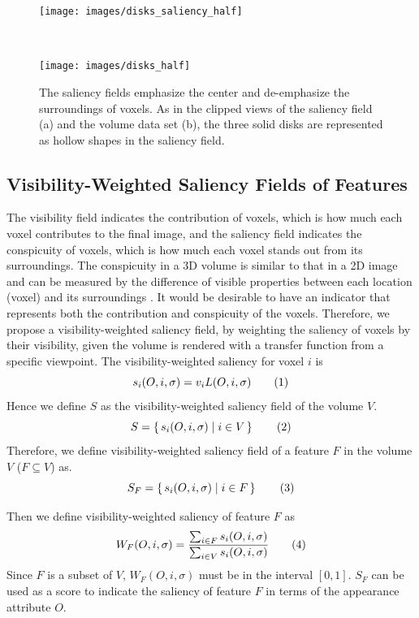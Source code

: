 \begin{figure}
	\centering
	\begin{minipage}{.4\textwidth}
		\texttt{[image: images/disks\_saliency\_half]}
		\subcaption{}
	\end{minipage}~
	\begin{minipage}{.4\textwidth}
		\texttt{[image: images/disks\_half]}
		\subcaption{}
	\end{minipage}
	\caption[The saliency fields emphasize the center and de-emphasize the surroundings of voxels.]{The saliency fields emphasize the center and de-emphasize the surroundings of voxels. As in the clipped views of the saliency field (a) and the volume data set (b), the three solid disks are represented as hollow shapes in the saliency field.}
	\label{fig:disks_saliency_half}
\end{figure}

\subsection{Visibility-Weighted Saliency Fields of Features \label{visibility_weighted_saliency}}
The visibility field indicates the contribution of voxels, which is how much each voxel contributes to the final image, and the saliency field indicates the conspicuity of voxels, which is how much each voxel stands out from its surroundings.
The conspicuity in a 3D volume is similar to that in a 2D image and can be measured by the difference of visible properties between each location (voxel) and its surroundings \cite{duan_visual_2011}.
It would be desirable to have an indicator that represents both the contribution and conspicuity of the voxels.
Therefore, we propose a visibility-weighted saliency field, by weighting the saliency of voxels by their visibility, given the volume is rendered with a transfer function from a specific viewpoint.
The visibility-weighted saliency for voxel $ i $ is
\[ s_{i}(O,i,\sigma)= v_{i} L(O,i,\sigma)
\addtag \]
Hence we define $ S $ as the visibility-weighted saliency field of the volume $ V $.
\[ S=\set{s_{i}(O,i,\sigma)|i \in V} 
\addtag \]
Therefore, we define visibility-weighted saliency field of a feature $ F $ in the volume $ V $ ($ F\subseteq V $) as.
\[ S_{F}=\set{s_{i}(O,i,\sigma)|i \in F} 
\addtag \]

Then we define visibility-weighted saliency of feature $ F $ as
\[ W_{F}(O,i,\sigma)=\frac{\sum_{i \in F}{s_{i}(O,i,\sigma)}}{\sum_{i \in V}{s_{i}(O,i,\sigma)}} 
\addtag \]
Since $ F $ is a subset of $ V $, $ W_{F}(O,i,\sigma) $ must be in the interval $ [0,1] $.
$ S_{F} $ can be used as a score to indicate the saliency of feature $ F $ in terms of the appearance attribute $ O $.

